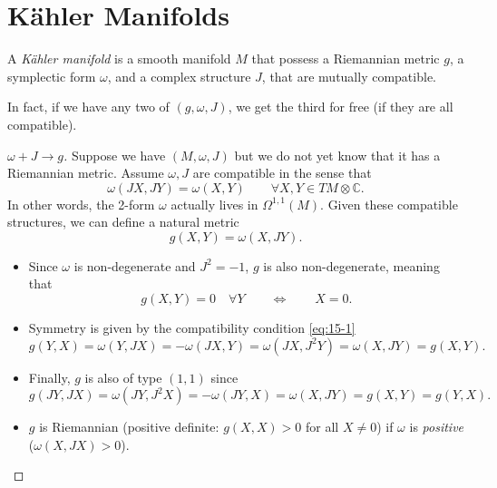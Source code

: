 \section{Kähler Manifolds}%
\label{sec:kahler_manifolds}

\begin{definition}
  A \emph{Kähler manifold} is a smooth manifold $M$ that possess a Riemannian metric $g$, a symplectic form $\omega$, and a complex structure $J$, that are mutually compatible.
\end{definition}
\begin{claim}
  In fact, if we have any two of $(g, \omega, J)$, we get the third for free (if they are all compatible).
\end{claim}
\begin{proof}[$\omega + J \to g$]
  Suppose we have $(M, \omega, J)$ but we do not yet know that it has a Riemannian metric.
  Assume $\omega, J$ are compatible in the sense that 
  \begin{equation}
    \label{eq:15-1}
    \omega(JX, JY) = \omega(X, Y) \qquad \forall X, Y \in TM \otimes \mathbb{C}.
  \end{equation}
  In other words, the 2-form $\omega$ actually lives in $\Omega^{1,1}(M)$.
  Given these compatible structures, we can define a natural metric
  \begin{equation}
    g(X, Y) = \omega(X, JY).
  \end{equation}
  \begin{itemize}
    \item Since $\omega$ is non-degenerate and $J^2 = -1$, $g$ is also non-degenerate, meaning that
      \begin{equation}
	g(X, Y) = 0 \quad \forall Y \qquad \iff \qquad X = 0.
      \end{equation}
    \item Symmetry is given by the compatibility condition \eqref{eq:15-1}
      \begin{equation}
	g(Y, X) = \omega(Y, JX) = -\omega(JX, Y) = \omega(J X, J^2 Y) = \omega(X, J Y) = g(X, Y).
      \end{equation}
    \item Finally, $g$ is also of type $(1, 1)$ since
      \begin{equation}
	g(JY, J X) = \omega(J Y, J^2 X) = -\omega (J Y, X) = \omega(X, J Y) = g(X, Y) = g(Y, X).
      \end{equation}
    \item $g$ is Riemannian (positive definite: $g(X, X) > 0$ for all $X \neq 0$) if $\omega$ is \emph{positive} ($\omega(X, J X) > 0$).
  \end{itemize}
\end{proof}

